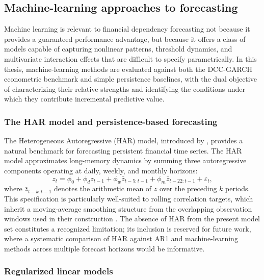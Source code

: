 \subsection{Machine-learning approaches to forecasting}

Machine learning is relevant to financial dependency forecasting not because it provides a guaranteed performance advantage, but because it offers a class of models capable of capturing nonlinear patterns, threshold dynamics, and multivariate interaction effects that are difficult to specify parametrically. In this thesis, machine-learning methods are evaluated against both the DCC-GARCH econometric benchmark and simple persistence baselines, with the dual objective of characterizing their relative strengths and identifying the conditions under which they contribute incremental predictive value.

\subsubsection{The HAR model and persistence-based forecasting}

The Heterogeneous Autoregressive (HAR) model, introduced by \citet{corsi2009har}, provides a natural benchmark for forecasting persistent financial time series. The HAR model approximates long-memory dynamics by summing three autoregressive components operating at daily, weekly, and monthly horizons:
\begin{equation}
    z_t = \phi_0 + \phi_d z_{t-1} + \phi_w \bar{z}_{t-5:t-1}
          + \phi_m \bar{z}_{t-22:t-1} + \varepsilon_t,
\end{equation}
where $\bar{z}_{t-k:t-1}$ denotes the arithmetic mean of $z$ over the preceding $k$ periods. This specification is particularly well-suited to rolling correlation targets, which inherit a moving-average smoothing structure from the overlapping observation windows used in their construction \citep{andersen2003realized}. The absence of HAR from the present model set constitutes a recognized limitation; its inclusion is reserved for future work, where a systematic comparison of HAR against AR1 and machine-learning methods across multiple forecast horizons would be informative.

\subsubsection{Regularized linear models}


